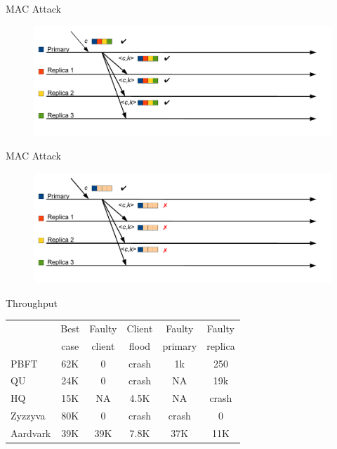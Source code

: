 \begin{frame}{MAC Attack}

\begin{figure}
	\includegraphics[width=\textwidth]{messages12}\\
\end{figure}

\end{frame}

\begin{frame}{MAC Attack}

\begin{figure}
	\includegraphics[width=\textwidth]{messages13}\\
\end{figure}

\end{frame}

\begin{frame}{Throughput}

\begin{table}	
\begin{tabular}{|l|c|c|c|c|c|}
\hline
	& Best & Faulty & Client & Faulty & Faulty \\
	& case & client & flood	& primary & replica \\ \hline
PBFT & 62K & 0 & crash & 1k & 250 \\ \hline	
QU & 24K & 0 & crash & NA & 19k \\ \hline
HQ & 15K &	NA & 4.5K &	NA & crash \\ \hline
Zyzzyva & 80K &	0 & crash & crash & 0 \\ \hline
Aardvark & 39K & 39K & 7.8K	& 37K & 11K \\ \hline
\end{tabular}	
\end{table}
\end{frame}

